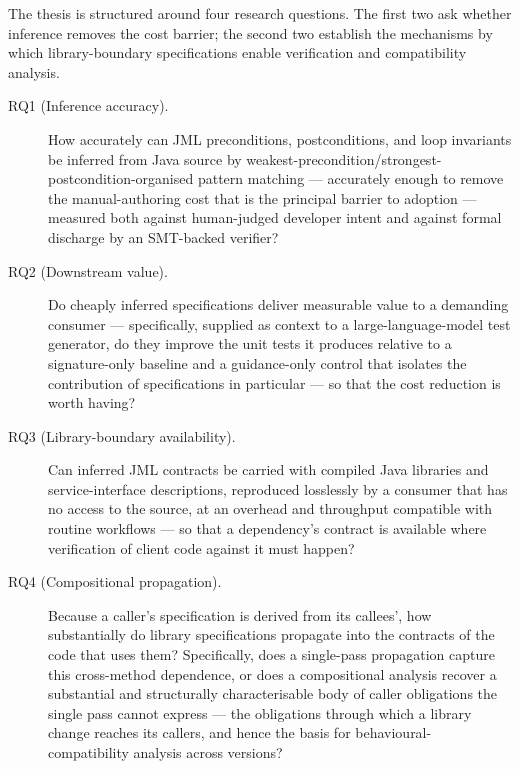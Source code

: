 The thesis is structured around four research questions. The first two ask
whether inference removes the cost barrier; the second two establish the
mechanisms by which library-boundary specifications enable verification and
compatibility analysis.

\begin{description}
  \item[RQ1 (Inference accuracy).] How accurately can JML preconditions,
        postconditions, and loop invariants be inferred from Java source by
        weakest-precondition/strongest-postcondition-organised pattern matching
        --- accurately enough to remove the manual-authoring cost that is the
        principal barrier to adoption --- measured both against human-judged
        developer intent and against formal discharge by an SMT-backed verifier?

  \item[RQ2 (Downstream value).] Do cheaply inferred specifications deliver
        measurable value to a demanding consumer --- specifically, supplied as
        context to a large-language-model test generator, do they improve the
        unit tests it produces relative to a signature-only baseline and a
        guidance-only control that isolates the contribution of specifications
        in particular --- so that the cost reduction is worth having?

  \item[RQ3 (Library-boundary availability).] Can inferred JML contracts be
        carried with compiled Java libraries and service-interface descriptions,
        reproduced losslessly by a consumer that has no access to the source, at
        an overhead and throughput compatible with routine workflows --- so that
        a dependency's contract is available where verification of client code
        against it must happen?

  \item[RQ4 (Compositional propagation).] Because a caller's specification is
        derived from its callees', how substantially do library specifications
        propagate into the contracts of the code that uses them? Specifically,
        does a single-pass propagation capture this cross-method dependence, or
        does a compositional analysis recover a substantial and structurally
        characterisable body of caller obligations the single pass cannot express
        --- the obligations through which a library change reaches its callers,
        and hence the basis for behavioural-compatibility analysis across
        versions?
\end{description}

